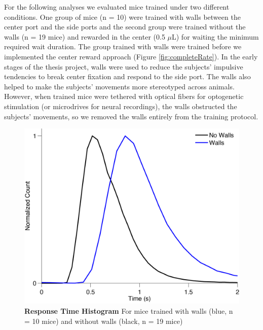 For the following analyses we evaluated mice trained under two different conditions. One group of mice (n = 10) were trained with walls between the center port and the side ports and the second group were trained without the walls (n = 19 mice) and rewarded in the center (0.5 $\mu$L) for waiting the minimum required wait duration. The group trained with walls were trained before we implemented the center reward approach (Figure \ref{fig:completeRate}). In the early stages of the thesis project, walls were used to reduce the subjects' impulsive tendencies to break center fixation and respond to the side port. The walls also helped to make the subjects' movements more stereotyped across animals. However, when trained mice were tethered with optical fibers for optogenetic stimulation (or microdrives for neural recordings), the walls obstructed the subjects' movements, so we removed the walls entirely from the training protocol.\par 
\begin{figure}
  \centering
  	\includegraphics[width=\textwidth]{Figures/chapter2/RTHistogram_Combined.png}
  \caption[Response Time Histogram]{\textbf{Response Time Histogram} For mice trained with walls (blue, n = 10 mice) and without walls (black, n = 19 mice)}
   \label{fig:rthistogram}
\end{figure}
